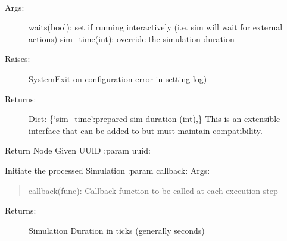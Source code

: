 \documentclass[letterpaper,10pt,english]{sphinxmanual}
\begin{document}
\begin{fulllineitems}

\begin{fulllineitems}
\label{index:aietes.Simulation.prepare}~\begin{description}
\item[{Args:}] \leavevmode
waits(bool): set if running interactively (i.e. sim will wait for external actions)
sim\_time(int): override the simulation duration

\item[{Raises:}] \leavevmode
SystemExit on configuration error in setting log)

\item[{Returns:}] \leavevmode
Dict: \{`sim\_time':prepared sim duration (int),\}
This is an extensible interface that can be added to but must maintain compatibility.

\end{description}

\end{fulllineitems}


\begin{fulllineitems}
\label{index:aietes.Simulation.reverse_node_lookup}
Return Node Given UUID
:param uuid:

\end{fulllineitems}


\begin{fulllineitems}
\label{index:aietes.Simulation.simulate}
Initiate the processed Simulation
:param callback:
Args:
\begin{quote}

callback(func): Callback function to be called at each execution step
\end{quote}
\begin{description}
\item[{Returns:}] \leavevmode
Simulation Duration in ticks (generally seconds)

\end{description}

\end{fulllineitems}


\end{fulllineitems}
\end{document}
